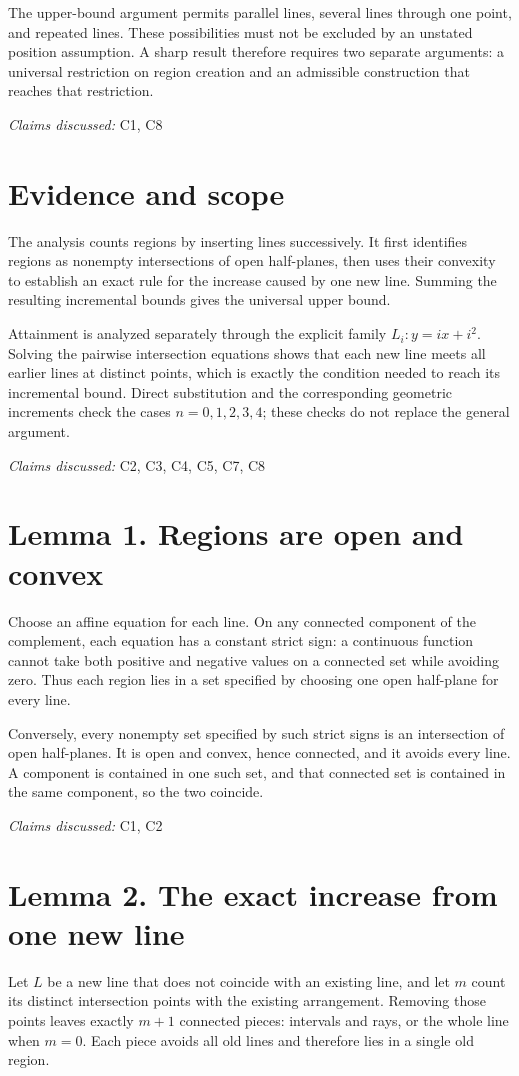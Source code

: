 \documentclass[11pt]{article}
\begin{document}
The upper-bound argument permits parallel lines, several lines through one point, and repeated lines. These possibilities must not be excluded by an unstated position assumption. A sharp result therefore requires two separate arguments: a universal restriction on region creation and an admissible construction that reaches that restriction.

\textit{Claims discussed: }C1, C8
\section{Evidence and scope}
The analysis counts regions by inserting lines successively. It first identifies regions as nonempty intersections of open half-planes, then uses their convexity to establish an exact rule for the increase caused by one new line. Summing the resulting incremental bounds gives the universal upper bound.

Attainment is analyzed separately through the explicit family $L_i:y=ix+i^2$. Solving the pairwise intersection equations shows that each new line meets all earlier lines at distinct points, which is exactly the condition needed to reach its incremental bound. Direct substitution and the corresponding geometric increments check the cases $n=0,1,2,3,4$; these checks do not replace the general argument.

\textit{Claims discussed: }C2, C3, C4, C5, C7, C8
\section{Lemma 1. Regions are open and convex}
Choose an affine equation for each line. On any connected component of the complement, each equation has a constant strict sign: a continuous function cannot take both positive and negative values on a connected set while avoiding zero. Thus each region lies in a set specified by choosing one open half-plane for every line.

Conversely, every nonempty set specified by such strict signs is an intersection of open half-planes. It is open and convex, hence connected, and it avoids every line. A component is contained in one such set, and that connected set is contained in the same component, so the two coincide.

\textit{Claims discussed: }C1, C2
\section{Lemma 2. The exact increase from one new line}
Let $L$ be a new line that does not coincide with an existing line, and let $m$ count its distinct intersection points with the existing arrangement. Removing those points leaves exactly $m+1$ connected pieces: intervals and rays, or the whole line when $m=0$. Each piece avoids all old lines and therefore lies in a single old region.
\end{document}
